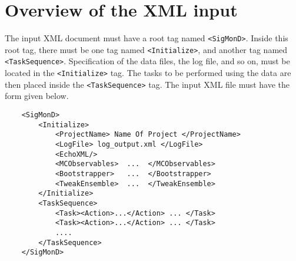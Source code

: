 \documentclass[12pt]{article}
\newcommand{\vb}{\texttt}
\begin{document}
\section{Overview of the XML input}
The input XML document must have a root tag named \vb{<SigMonD>}. 
Inside this root tag, there must be one tag named \vb{<Initialize>},
and another tag named \vb{<TaskSequence>}.  Specification of the data
files, the log file, and so on, must be located in the \vb{<Initialize>}
tag.  The tasks to be performed using the data are then placed inside
the \vb{<TaskSequence>} tag.   The input XML file must have the form
given below.    

\begin{verbatim}
    <SigMonD>
        <Initialize>
            <ProjectName> Name Of Project </ProjectName>
            <LogFile> log_output.xml </LogFile>
            <EchoXML/>
            <MCObservables>  ...  </MCObservables>
            <Bootstrapper>   ...  </Bootstrapper>
            <TweakEnsemble>  ...  </TweakEnsemble>
        </Initialize>
        <TaskSequence>
            <Task><Action>...</Action> ... </Task>
            <Task><Action>...</Action> ... </Task>
            .... 
        </TaskSequence>
    </SigMonD>
\end{verbatim}
\end{document}
